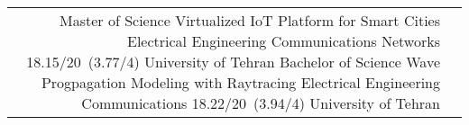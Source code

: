 \begin{supertabular}{rl}
    {Master of Science}
    {Virtualized IoT Platform for Smart Cities}
    {}
    {Electrical Engineering}
    {Communications Networks}
    {18.15/20~(3.77/4)}
    {University of Tehran}
    {Bachelor of Science}
    {Wave Progpagation Modeling with Raytracing}
    {Electrical Engineering}
    {Communications}
    {18.22/20~(3.94/4)}
    {}
    {University of Tehran}
\end{supertabular}

